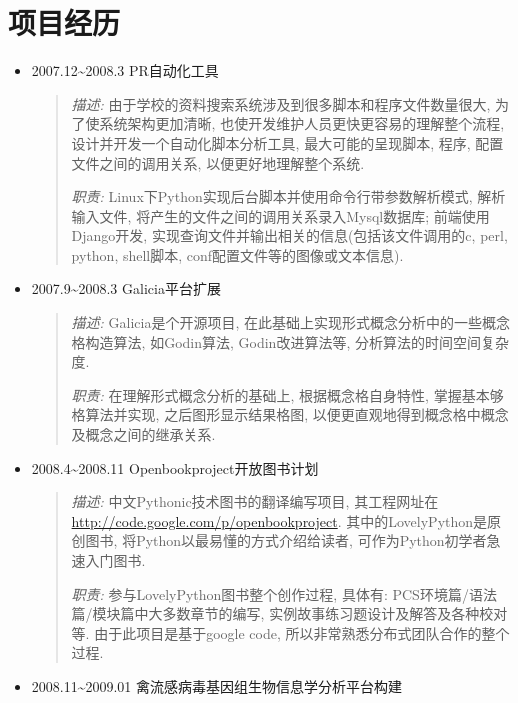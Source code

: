 \documentclass[a4paper,10pt,english]{manual}
\begin{document}
\section{项目经历}
\begin{itemize}
\item {} 
2007.12\textasciitilde{}2008.3 PR自动化工具
\begin{quote}

\emph{描述:} 由于学校的资料搜索系统涉及到很多脚本和程序文件数量很大, 为了使系统架构更加清晰, 也使开发维护人员更快更容易的理解整个流程, 设计并开发一个自动化脚本分析工具, 最大可能的呈现脚本, 程序, 配置文件之间的调用关系, 以便更好地理解整个系统.

\emph{职责:} Linux下Python实现后台脚本并使用命令行带参数解析模式, 解析输入文件, 将产生的文件之间的调用关系录入Mysql数据库; 前端使用Django开发, 实现查询文件并输出相关的信息(包括该文件调用的c, perl, python, shell脚本, conf配置文件等的图像或文本信息).
\end{quote}

\item {} 
2007.9\textasciitilde{}2008.3 Galicia平台扩展
\begin{quote}

\emph{描述:} Galicia是个开源项目, 在此基础上实现形式概念分析中的一些概念格构造算法, 如Godin算法, Godin改进算法等, 分析算法的时间空间复杂度.

\emph{职责:} 在理解形式概念分析的基础上, 根据概念格自身特性, 掌握基本够格算法并实现, 之后图形显示结果格图, 以便更直观地得到概念格中概念及概念之间的继承关系.
\end{quote}

\item {} 
2008.4\textasciitilde{}2008.11 Openbookproject开放图书计划
\begin{quote}

\emph{描述:} 中文Pythonic技术图书的翻译编写项目, 其工程网址在 \href{http://code.google.com/p/openbookproject/}{http://code.google.com/p/openbookproject}. 其中的LovelyPython是原创图书, 将Python以最易懂的方式介绍给读者, 可作为Python初学者急速入门图书.


\emph{职责:} 参与LovelyPython图书整个创作过程, 具体有: PCS环境篇/语法篇/模块篇中大多数章节的编写, 实例故事练习题设计及解答及各种校对等. 由于此项目是基于google code, 所以非常熟悉分布式团队合作的整个过程.
\end{quote}

\item {} 
2008.11\textasciitilde{}2009.01 禽流感病毒基因组生物信息学分析平台构建
\begin{quote}


\end{quote}
\end{itemize}
\end{document}
